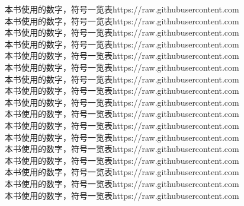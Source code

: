 \vspace{\myLineheight}\begin{multicols}{2}\raggedcolumns{}\end{multicols}


{\cjk\mktsFontfileBabelstonehan{}本书使用的数字，符号一览表https://raw.githubusercontent.com}\\
{\cjk\mktsFontfileCwtexqfangsongmedium{}本书使用的数字，符号一览表https://raw.githubusercontent.com}\\
{\cjk\mktsFontfileCwtexqheibold{}本书使用的数字，符号一览表https://raw.githubusercontent.com}\\
{\cjk\mktsFontfileCwtexqkaimedium{}本书使用的数字，符号一览表https://raw.githubusercontent.com}\\
{\cjk\mktsFontfileCwtexqmingmedium{}本书使用的数字，符号一览表https://raw.githubusercontent.com}\\
{\cjk\mktsFontfileCwtexqyuanmedium{}本书使用的数字，符号一览表https://raw.githubusercontent.com}\\
{\cjk\mktsFontfileDejavusansbold{}本书使用的数字，符号一览表https://raw.githubusercontent.com}\\
{\cjk\mktsFontfileDejavusansboldoblique{}本书使用的数字，符号一览表https://raw.githubusercontent.com}\\
{\cjk\mktsFontfileDejavusansoblique{}本书使用的数字，符号一览表https://raw.githubusercontent.com}\\
{\cjk\mktsFontfileDejavusans{}本书使用的数字，符号一览表https://raw.githubusercontent.com}\\
{\cjk\mktsFontfileDejavusanscondensedbold{}本书使用的数字，符号一览表https://raw.githubusercontent.com}\\
{\cjk\mktsFontfileDejavusanscondensedboldoblique{}本书使用的数字，符号一览表https://raw.githubusercontent.com}\\
{\cjk\mktsFontfileDejavusanscondensedoblique{}本书使用的数字，符号一览表https://raw.githubusercontent.com}\\
{\cjk\mktsFontfileDejavusanscondensed{}本书使用的数字，符号一览表https://raw.githubusercontent.com}\\
{\cjk\mktsFontfileDejavusansmonobold{}本书使用的数字，符号一览表https://raw.githubusercontent.com}\\
{\cjk\mktsFontfileDejavusansmonoboldoblique{}本书使用的数字，符号一览表https://raw.githubusercontent.com}\\
{\cjk\mktsFontfileDejavusansmonooblique{}本书使用的数字，符号一览表https://raw.githubusercontent.com}\\
